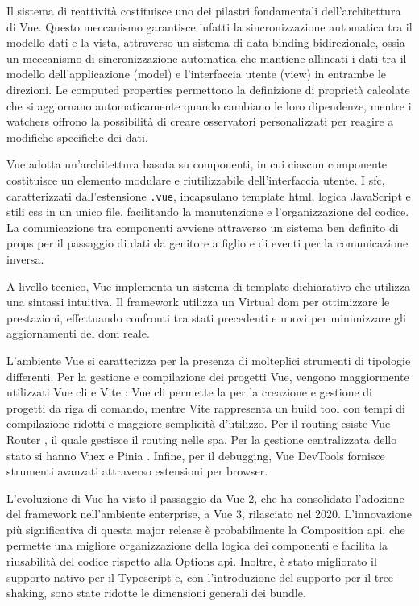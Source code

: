Il sistema di reattività costituisce uno dei pilastri fondamentali dell'architettura di Vue. Questo meccanismo
garantisce infatti la sincronizzazione automatica tra il modello dati e la vista, attraverso un sistema di
data binding bidirezionale, ossia un meccanismo di sincronizzazione automatica che mantiene allineati i dati tra
il modello dell'applicazione (model) e l'interfaccia utente (view) in entrambe le direzioni. Le computed properties
permettono la definizione di proprietà calcolate che si aggiornano automaticamente quando cambiano le loro dipendenze,
mentre i watchers offrono la possibilità di creare osservatori personalizzati per reagire a modifiche specifiche
dei dati.

Vue adotta un'architettura basata su componenti, in cui ciascun componente costituisce un elemento modulare e
riutilizzabile dell'interfaccia utente. I \acrfull{sfc}, caratterizzati dall'estensione \texttt{.vue},
incapsulano template \acrshort{html}, logica JavaScript e stili \acrshort{css} in un unico file,
facilitando la manutenzione e l'organizzazione del codice. La comunicazione tra componenti avviene attraverso
un sistema ben definito di props per il passaggio di dati da genitore a figlio e di eventi per la comunicazione inversa.

A livello tecnico, Vue implementa un sistema di template dichiarativo che utilizza una sintassi intuitiva. Il framework
utilizza un Virtual \acrshort{dom} per ottimizzare le prestazioni, effettuando confronti tra stati precedenti e nuovi
per minimizzare gli aggiornamenti del \acrshort{dom} reale.

L'ambiente Vue si caratterizza per la presenza di molteplici strumenti di tipologie differenti. Per la gestione e
compilazione dei progetti Vue, vengono maggiormente utilizzati Vue \acrshort{cli} \cite{vuecli2018} e
Vite \cite{vite2021}: Vue \acrshort{cli} permette la per la creazione e gestione di progetti da riga di comando,
mentre Vite rappresenta un build tool con tempi di compilazione ridotti e maggiore semplicità d'utilizzo.
Per il routing esiste Vue Router \cite{vuerouter2016}, il quale gestisce il routing nelle \acrfull{spa}.
Per la gestione centralizzata dello stato si hanno Vuex \cite{vuex2016} e Pinia \cite{pinia2021}.
Infine, per il debugging, Vue DevTools \cite{vuedevtools2016} fornisce strumenti avanzati attraverso estensioni
per browser.

L'evoluzione di Vue ha visto il passaggio da Vue 2, che ha consolidato l'adozione del framework nell'ambiente
enterprise, a Vue 3, rilasciato nel 2020. L'innovazione più significativa di questa major release è probabilmente la
Composition \acrshort{api}, che permette una migliore organizzazione della logica dei componenti e facilita la
riusabilità del codice rispetto alla Options \acrshort{api}. Inoltre, è stato migliorato il supporto nativo per il
Typescript e, con l'introduzione del supporto per il tree-shaking, sono state ridotte le dimensioni generali dei bundle.

